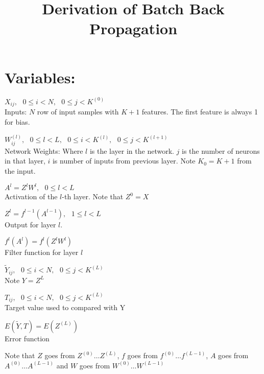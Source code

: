 \documentclass[14pt,letter,oneside]{article}
\begin{document}
\title{Derivation of Batch Back Propagation }
\maketitle
	
	\section*{Variables:}
	\begin{list}{-}{}
		\item{$X_{ij}, \hspace{8pt} 0\leq i < N, \hspace{8pt} 0\leq j < K^{(0)}$} \\ 
		Inputs:  $N$ row of input samples with $K + 1$ features. The first feature is always 1 for bias.
		
		\item{ $W^{(l)}_{ij}, \hspace{8pt} 0\leq l < L, \hspace{8pt} 0 \leq i < K^{(l)}, \hspace{8pt} 0 \leq j < K^{(l+1)} $} \\
		Network Weights: Where $l$ is the layer in the network. $j$ is the number of neurons in that layer, $i$ is number of inputs from previous layer. Note $K_0 = K+1$ from the input.
		
		\item{ $A^l= Z^l W^l, \hspace{8pt} 0 \leq l < L$ } \\
		Activation of the $l$-th layer. Note that $Z^0 = X$
		
		\item { $Z^l = f^{l-1}(A^{l-1}), \hspace{8pt} 1 \leq l < L$} \\
		Output for layer $l$. 
	
		\item { $f^l(A^l) = f^l( Z^l W^l ) $} \\
		Filter function for layer $l$
		
		\item { $\tilde{Y}_{ij},  \hspace{8pt} 0\leq i < N, \hspace{8pt} 0\leq j < K^{(L)} $} \\
		Note $Y = Z^L$
		
		\item { $T_{ij}, \hspace{8pt} 0\leq i < N, \hspace{8pt} 0\leq j < K^{(L)} $ } \\
		Target value used to compared with Y
		
		\item { $E(\tilde{Y}, T) = E(Z^{(L)})$ } 
		\\ Error function 
 
	\end{list}
	 Note that $Z$ goes from $Z^{(0)}\ldots Z^{(L)}$, $f$ goes from $f^{(0)} \ldots f^{(L-1)}$, $A$ goes from $A^{(0)} \ldots A^{(L-1)}$ and $W$ goes from $W^{(0)} \ldots W^{(L-1)}$ \\\
	 
\end{document}
